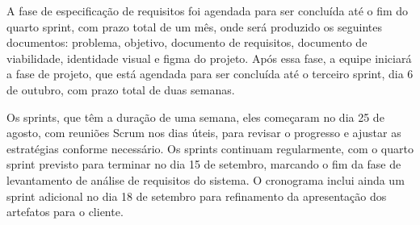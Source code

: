 \hspace{4.5mm}
A fase de especificação de requisitos foi agendada para ser concluída até o fim do quarto sprint, com prazo total de um mês, onde será produzido os seguintes documentos: problema, objetivo, documento de requisitos, documento de viabilidade, identidade visual e figma do projeto. Após essa fase, a equipe iniciará a fase de projeto, que está agendada para ser concluída até o terceiro sprint, dia 6 de outubro, com prazo total de duas semanas.
\par
Os sprints, que têm a duração de uma semana, eles começaram no dia 25 de agosto, com reuniões Scrum nos dias úteis, para revisar o progresso e ajustar as estratégias conforme necessário. Os sprints continuam regularmente, com o quarto sprint previsto para terminar no dia 15 de setembro, marcando o fim da fase de levantamento de análise de requisitos do sistema. O cronograma inclui ainda um sprint adicional no dia 18 de setembro para refinamento da apresentação dos artefatos para o cliente.